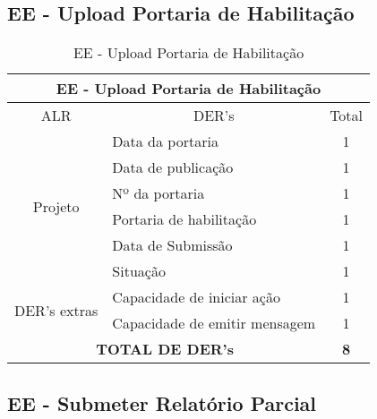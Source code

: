   \subsection{EE - Upload Portaria de Habilitação}
\begin{table}[!h]
\centering
\caption{EE - Upload Portaria de Habilitação}
\label{ee_upload_portaria_de_habilitacao}
\begin{tabular}{|c|l|c|}
\hline
\multicolumn{3}{|c|}{EE - Upload Portaria de Habilitação}                    \\ \hline
ALR                      & \multicolumn{1}{c|}{DER's} & Total \\ \hline
\multirow{6}{*}{Projeto} & Data da portaria                         & 1     \\ \cline{2-3} 
                         & Data de publicação            & 1     \\ \cline{2-3} 
                         & Nº da portaria      & 1     \\ \cline{2-3} 
                         & Portaria de habilitação              & 1     \\ \cline{2-3}
			 & Data de Submissão        & 1     \\ \cline{2-3} 
                         & Situação & 1     \\ \hline
\multirow{2}{*}{DER's extras}             & Capacidade de iniciar ação & 1      \\ \cline{2-3} 
			 & Capacidade de emitir mensagem & 1\\ \hline
\multicolumn{2}{|c|}{\textbf{TOTAL DE DER's}}                  & \textbf{8}     \\ \hline
\end{tabular}
\end{table}

\pagebreak
  \subsection{EE - Submeter Relatório Parcial}

